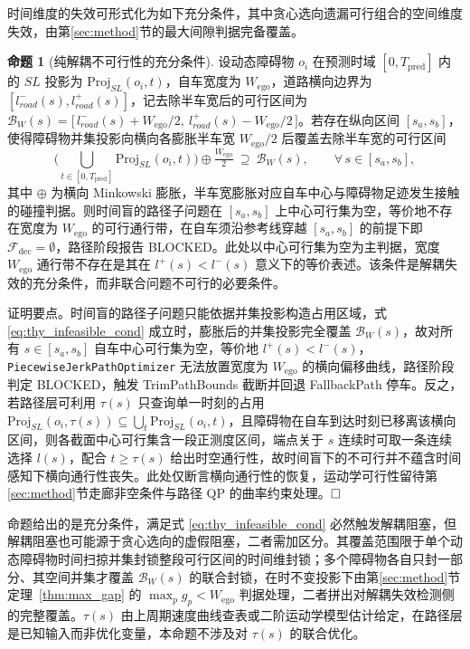 \documentclass[a4paper,zihao=5]{ctexart}
\theoremstyle{definition}
\newtheorem{proposition}{命题}[section]
\begin{document}
时间维度的失效可形式化为如下充分条件，其中贪心选向遗漏可行组合的空间维度失效，由第\ref{sec:method}节的最大间隙判据完备覆盖。

\begin{proposition}[纯解耦不可行性的充分条件]
\label{prop:decoupled_infeasible}
设动态障碍物 $o_i$ 在预测时域 $[0, T_{\text{pred}}]$ 内的 $SL$ 投影为 $\mathrm{Proj}_{SL}(o_i, t)$，自车宽度为 $W_{\text{ego}}$，道路横向边界为 $[l_{road}^{-}(s), l_{road}^{+}(s)]$，记去除半车宽后的可行区间为 $\mathcal{B}_{W}(s) = \bigl[\, l_{road}^{-}(s) + W_{\text{ego}}/2,\ l_{road}^{+}(s) - W_{\text{ego}}/2 \,\bigr]$。若存在纵向区间 $[s_a, s_b]$，使得障碍物并集投影向横向各膨胀半车宽 $W_{\text{ego}}/2$ 后覆盖去除半车宽的可行区间
\begin{equation}
    \Big(\bigcup_{t \in [0, T_{\text{pred}}]} \mathrm{Proj}_{SL}(o_i, t)\Big) \oplus \tfrac{W_{\text{ego}}}{2}\ \supseteq\ \mathcal{B}_{W}(s), \qquad \forall\, s \in [s_a, s_b],
    \label{eq:thy_infeasible_cond}
\end{equation}
其中 $\oplus$ 为横向 Minkowski 膨胀，半车宽膨胀对应自车中心与障碍物足迹发生接触的碰撞判据。则时间盲的路径子问题在 $[s_a, s_b]$ 上中心可行集为空，等价地不存在宽度为 $W_{\text{ego}}$ 的可行通行带，在自车须沿参考线穿越 $[s_a, s_b]$ 的前提下即 $\mathcal{F}_{\text{dec}} = \emptyset$，路径阶段报告 BLOCKED。此处以中心可行集为空为主判据，宽度 $W_{\text{ego}}$ 通行带不存在是其在 $l^{+}(s) < l^{-}(s)$ 意义下的等价表述。该条件是解耦失效的充分条件，而非联合问题不可行的必要条件。
\end{proposition}

证明要点。时间盲的路径子问题只能依据并集投影构造占用区域，式 \eqref{eq:thy_infeasible_cond} 成立时，膨胀后的并集投影完全覆盖 $\mathcal{B}_{W}(s)$，故对所有 $s \in [s_a, s_b]$ 自车中心可行集为空，等价地 $l^{+}(s) < l^{-}(s)$，\texttt{PiecewiseJerkPathOptimizer} 无法放置宽度为 $W_{\text{ego}}$ 的横向偏移曲线，路径阶段判定 BLOCKED，触发 TrimPathBounds 截断并回退 FallbackPath 停车。反之，若路径层可利用 $\tau(s)$ 只查询单一时刻的占用 $\mathrm{Proj}_{SL}(o_i, \tau(s)) \subseteq \bigcup_t \mathrm{Proj}_{SL}(o_i, t)$，且障碍物在自车到达时刻已移离该横向区间，则各截面中心可行集含一段正测度区间，端点关于 $s$ 连续时可取一条连续选择 $l(s)$，配合 $t \geq \tau(s)$ 给出时空通行性，故时间盲下的不可行并不蕴含时间感知下横向通行性丧失。此处仅断言横向通行性的恢复，运动学可行性留待第\ref{sec:method}节走廊非空条件与路径 QP 的曲率约束处理。$\hfill\Box$

命题给出的是充分条件，满足式 \eqref{eq:thy_infeasible_cond} 必然触发解耦阻塞，但解耦阻塞也可能源于贪心选向的虚假阻塞，二者需加区分。其覆盖范围限于单个动态障碍物时间扫掠并集封锁整段可行区间的时间维封锁；多个障碍物各自只封一部分、其空间并集才覆盖 $\mathcal{B}_{W}(s)$ 的联合封锁，在时不变投影下由第\ref{sec:method}节定理~\ref{thm:max_gap} 的 $\max_p g_p < W_{\text{ego}}$ 判据处理，二者拼出对解耦失效检测侧的完整覆盖。$\tau(s)$ 由上周期速度曲线查表或二阶运动学模型估计给定，在路径层是已知输入而非优化变量，本命题不涉及对 $\tau(s)$ 的联合优化。
\end{document}
